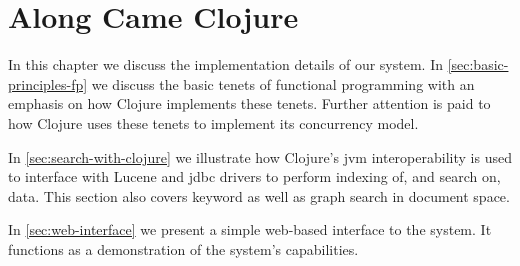 \chapter{Along Came Clojure}
\label{chap:along-came-clojure}
	In this chapter we discuss the implementation details of our system.  In \cref{sec:basic-principles-fp} we discuss the basic tenets of functional programming with an emphasis on how Clojure implements these tenets.  Further attention is paid to how Clojure uses these tenets to implement its concurrency model.
	
	In \cref{sec:search-with-clojure} we illustrate how Clojure's \gls{jvm} interoperability is used to interface with Lucene and \gls{jdbc} drivers to perform indexing of, and search on, data.  This section also covers keyword as well as graph search in document space.
	
	In \cref{sec:web-interface} we present a simple web-based interface to the system.  It functions as a demonstration of the system's capabilities.
	
	
	
	